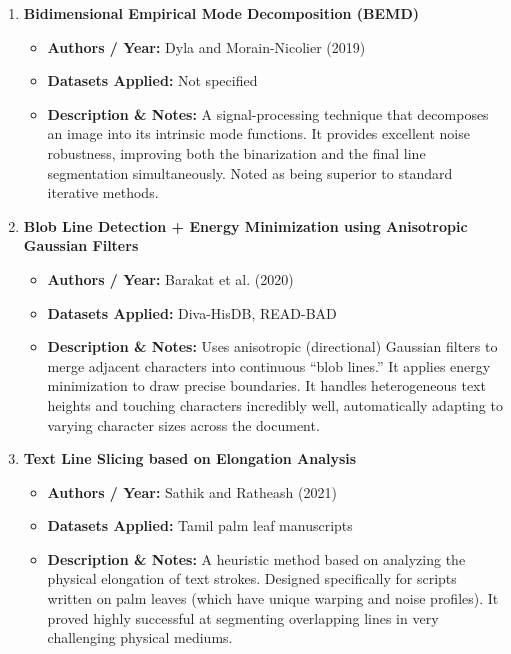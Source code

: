 \documentclass{article}
\begin{document}
\begin{enumerate}[label=\textbf{\arabic*.}]
    \item \textbf{Bidimensional Empirical Mode Decomposition (BEMD)}
    \begin{itemize}
        \item \textbf{Authors / Year:} Dyla and Morain-Nicolier (2019)
        \item \textbf{Datasets Applied:} Not specified
        \item \textbf{Description \& Notes:} A signal-processing technique that decomposes an image into its intrinsic mode functions. It provides excellent noise robustness, improving both the binarization and the final line segmentation simultaneously. Noted as being superior to standard iterative methods.
    \end{itemize}

    \item \textbf{Blob Line Detection + Energy Minimization using Anisotropic Gaussian Filters}
    \begin{itemize}
        \item \textbf{Authors / Year:} Barakat et al. (2020)
        \item \textbf{Datasets Applied:} Diva-HisDB, READ-BAD
        \item \textbf{Description \& Notes:} Uses anisotropic (directional) Gaussian filters to merge adjacent characters into continuous ``blob lines.'' It applies energy minimization to draw precise boundaries. It handles heterogeneous text heights and touching characters incredibly well, automatically adapting to varying character sizes across the document.
    \end{itemize}

    \item \textbf{Text Line Slicing based on Elongation Analysis}
    \begin{itemize}
        \item \textbf{Authors / Year:} Sathik and Ratheash (2021)
        \item \textbf{Datasets Applied:} Tamil palm leaf manuscripts
        \item \textbf{Description \& Notes:} A heuristic method based on analyzing the physical elongation of text strokes. Designed specifically for scripts written on palm leaves (which have unique warping and noise proﬁles). It proved highly successful at segmenting overlapping lines in very challenging physical mediums.
    \end{itemize}


\end{enumerate}
\end{document}
